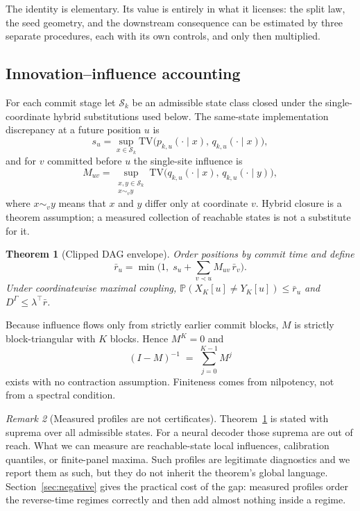 \documentclass[11pt,a4paper]{article}
\theoremstyle{plain}
\newtheorem{theorem}{Theorem}[section]
\theoremstyle{definition}
\theoremstyle{remark}
\newtheorem{remark}[theorem]{Remark}
\newcommand{\TV}{\mathrm{TV}}
\newcommand{\Prob}{\mathbb{P}}
\begin{document}
The identity is elementary. Its value is entirely in what it licenses: the split
law, the seed geometry, and the downstream consequence can be estimated by three
separate procedures, each with its own controls, and only then multiplied.

\subsection{Innovation--influence accounting}

For each commit stage let $\mathcal{S}_k$ be an admissible state class closed
under the single-coordinate hybrid substitutions used below. The same-state
implementation discrepancy at a future position $u$ is
\[
  s_u = \sup_{x \in \mathcal{S}_k}
  \TV\big(p_{k,u}(\cdot \mid x),\,q_{k,u}(\cdot \mid x)\big),
\]
and for $v$ committed before $u$ the single-site influence is
\[
  M_{uv} = \sup_{\substack{x,y \in \mathcal{S}_k\\x\sim_v y}}
  \TV\big(q_{k,u}(\cdot \mid x),\,q_{k,u}(\cdot \mid y)\big),
\]
where $x\sim_v y$ means that $x$ and $y$ differ only at coordinate $v$. Hybrid
closure is a theorem assumption; a measured collection of reachable states is
not a substitute for it.

\begin{theorem}[Clipped DAG envelope]
\label{thm:dag}
Order positions by commit time and define
\[
  \bar r_u = \min\Big(1,\; s_u + \sum_{v \prec u} M_{uv}\, \bar r_v\Big).
\]
Under coordinatewise maximal coupling,
$\Prob(X_K[u] \neq Y_K[u]) \le \bar r_u$ and $D^\Gamma \le \lambda^\top \bar r$.
\end{theorem}

Because influence flows only from strictly earlier commit blocks, $M$ is strictly
block-triangular with $K$ blocks. Hence $M^K = 0$ and
\[
  (I - M)^{-1} \;=\; \sum_{j=0}^{K-1} M^{j}
\]
exists with no contraction assumption. Finiteness comes from nilpotency, not from
a spectral condition.

\begin{remark}[Measured profiles are not certificates]
\label{rem:notcert}
Theorem~\ref{thm:dag} is stated with suprema over all admissible states. For a
neural decoder those suprema are out of reach. What we can measure are
reachable-state local influences, calibration quantiles, or finite-panel maxima.
Such profiles are legitimate diagnostics and we report them as such, but they do
not inherit the theorem's global language. Section~\ref{sec:negative} gives the
practical cost of the gap: measured profiles order the reverse-time regimes
correctly and then add almost nothing inside a regime.
\end{remark}
\end{document}
